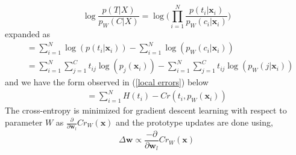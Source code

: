 \begin{equation*}
	\log \frac{p\left( T|X\right) }{p_{W}\left( C|X\right) } = \log \bigg(\prod_{i=1}^{N}\frac{p\left( t_{i}|\mathbf{x}_{i}\right) }{p_{W}\left( c_{i}|\mathbf{x}_{i}\right)}\bigg)
\end{equation*}
expanded as
\begin{align*}
	&= \sum_{i=1}^{N}\log\left( p\left( t_{i}|\mathbf{x}_{i}\right)\right) - \sum_{i=1}^{N}\log\left( p_{W}\left( c_{i}|\mathbf{x}_{i}\right)\right) \\
	&=\sum_{i=1}^{N}\sum_{j=1}^{C}t_{ij}\log\left( p_{j}\left( \mathbf{x}_{i}\right) \right)- \sum_{i=1}^{N}\sum_{j=1}^{C}t_{ij}\log\left( p_{W}\left(j| \mathbf{x}_{i}\right) \right)
\end{align*}
and we have the form observed in (\ref{local errors}) below
\begin{align*}
	=\sum_{i=1}^{N}H\left( t_{i}\right)  - Cr\left( t_{i},p_{W}\left( \mathbf{x}_{i}\right) \right) 
\end{align*}
The cross-entropy is minimized for gradient descent learning with respect to parameter\hspace{2pt} $W$\hspace{2pt}  as \hspace{2pt}$\frac{\partial}{\partial \mathbf{w}_{l}}Cr_{W}\left( \mathbf{x}\right)$\hspace{2pt} and the prototype updates are done using,
\begin{equation}
	\Delta \mathbf{w}\propto \frac{-\partial}{\partial \mathbf{w}_{l}}Cr_{W}\left( \mathbf{x}\right)
\end{equation}


